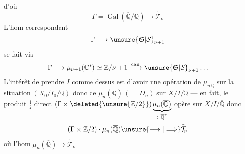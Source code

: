 d'où
\[
\Gamma=\operatorname{Gal}(\overline{\mathbb Q}/\mathbb Q)
\longrightarrow\widetilde{\mathcal T}_\nu
\]
L'hom correspondant
\[
\Gamma\longrightarrow\unsure{\mathfrak S|\mathcal S}_{\nu+1}
\]
se fait via
\[
\Gamma\longrightarrow\mu_{\nu+1}(\mathbb C^{*})\simeq\mathbb Z/\nu+1
\xrightarrow{\mathrm{can}}\unsure{\mathfrak S|\mathcal S}_{\nu+1}\ldots
\]
L'intérêt de prendre $I$ comme
dessus est d'avoir une opération
de $\mu_{n\,\mathbb Q}$  sur la situation
$(X_0/I_0/\mathbb Q)$ donc de $\mu_n(\overline{\mathbb Q})\ (=D_n)$
sur $X/I/\mathbb Q$ --- en fait, le
produit $\tfrac12$ direct
$(\Gamma\times\deleted{\unsure{\mathbb Z/2}})\underbrace{\mu_n(\overline{\mathbb Q})}_{\subset\overline{\mathbb Q}^{*}}$\unsure{$=$}
opère sur $X/I/\overline{\mathbb Q}$ donc
\[
(\Gamma\times\mathbb Z/2)\cdot\mu_n(\overline{\mathbb Q})
\unsure{\longrightarrow|\Longrightarrow}
\widetilde{\mathcal T}_\nu
\]
où l'hom $\mu_n(\overline{\mathbb Q})\longrightarrow\widetilde{\mathcal T}_\nu$
